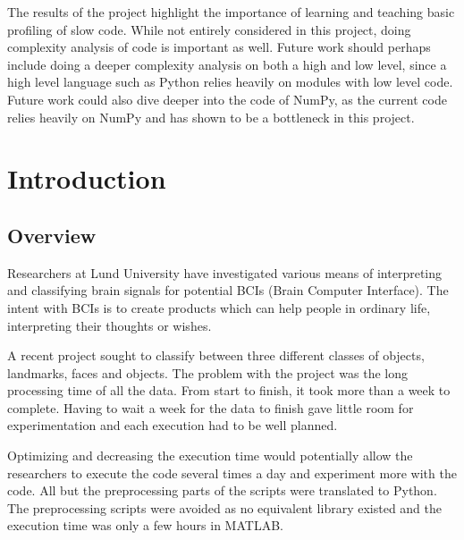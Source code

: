 \documentclass[12pt, a4paper]{article}
\begin{document}
The results of the project highlight the importance of learning and teaching basic profiling of slow code.
While not entirely considered in this project, doing complexity analysis of code is important as well.
Future work should perhaps include doing a deeper complexity analysis on both a high and low level, since a high level language such as Python relies heavily on modules with low level code.
Future work could also dive deeper into the code of NumPy, as the current code relies heavily on NumPy and has shown to be a bottleneck in this project.



\tableofcontents


\glsaddall
\renewcommand*{\arraystretch}{1.1}
\printglossary[type=main,style=long,nonumberlist]

\newpage

\section{Introduction}

\subsection{Overview}

Researchers at Lund University have investigated various means of interpreting and classifying brain signals for potential BCIs (Brain Computer Interface). 
The intent with BCIs is to create products which can help people in ordinary life, interpreting their thoughts or wishes.

A recent project sought to classify between three different classes of objects, landmarks, faces and objects.
The problem with the project was the long processing time of all the data.
From start to finish, it took more than a week to complete.
Having to wait a week for the data to finish gave little room for experimentation and each execution had to be well planned.

Optimizing and decreasing the execution time would potentially allow the researchers to execute the code several times a day and experiment more with the code.
All but the preprocessing parts of the scripts were translated to Python.
The preprocessing scripts were avoided as no equivalent library existed and the execution time was only a few hours in MATLAB.
\end{document}
